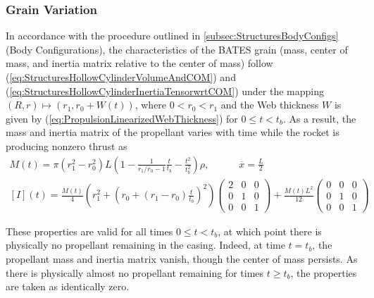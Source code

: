 \documentclass[11pt,dvipsnames]{thesis}
\begin{document}
\subsubsection{Grain Variation}
In accordance with the procedure outlined in \ref{subsec:StructuresBodyConfigs} (Body Configurations), the characteristics of the BATES grain (mass, center of mass, and inertia matrix relative to the center of mass) follow (\ref{eq:StructuresHollowCylinderVolumeAndCOM}) and (\ref{eq:StructuresHollowCylinderInertiaTensorwrtCOM}) under the mapping $(R, r) \mapsto (r_1, r_0 + W(t))$, where $0 < r_0 < r_1$ and the Web thickness $W$ is given by (\ref{eq:PropulsionLinearizedWebThickness}) for $0 \leqslant t < t_b$. As a result, the mass and inertia matrix of the propellant varies with time while the rocket is producing nonzero thrust as
\begin{gather}
M(t) = \pi (r_1^2 - r_0^2) L \left(1 - \frac{1}{r_1/r_0 - 1} \frac{t}{t_b} - \frac{t^2}{t_b^2}\right)\rho, \qquad\quad \overline{x} = \frac{L}{2} \label{eq:PropulsionBATESMassAndCOM} \\
[I](t) = \frac{M(t)}{4} \left(r_1^2 + \left(r_0 + (r_1 - r_0) \frac{t}{t_b}\right)^{\!2}\right)\begin{pmatrix}2 & 0 & 0 \\ 0 & 1 & 0 \\ 0 & 0 & 1\end{pmatrix} + \frac{M(t) L^2}{12} \begin{pmatrix}0 & 0 & 0 \\ 0 & 1 & 0 \\ 0 & 0 & 1\end{pmatrix} \label{eq:PropulsionBATESInertiaTensor}
\end{gather}

These properties are valid for all times $0 \leqslant t < t_b$, at which point there is physically no propellant remaining in the casing. Indeed, at time $t = t_b$, the propellant mass and inertia matrix vanish, though the center of mass persists. As there is physically almost no propellant remaining for times $t \geqslant t_b$, the properties are taken as identically zero.
\end{document}
